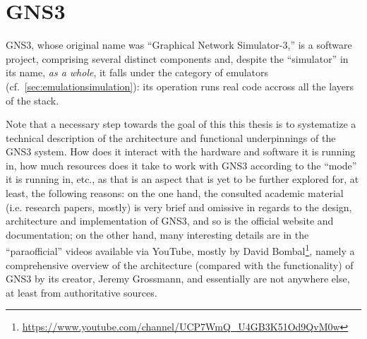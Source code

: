 
\chapter{GNS3}
\label{ch:gns3}

GNS3, whose original name was ``Graphical Network Simulator-3,'' is a software project, comprising several distinct components and, despite the ``simulator'' in its name, \emph{as a whole}, it falls under the category of emulators (cf.~\ref{sec:emulationsimulation}): its operation runs real code accross all the layers of the stack. %

Note that a necessary step towards the goal of this this thesis is to systematize a technical description of the architecture and functional underpinnings of the GNS3 system.
How does it interact with the hardware and software it is running in, how much resources does it take to work with GNS3 according to the ``mode'' it is running in, etc., as that is an aspect that is yet to be further explored for, at least, the following reasons:  %
on the one hand, the consulted academic material (i.e. research papers, mostly) is very brief and omissive in regards to the design, architecture and implementation of GNS3, and so is the official website and documentation; on the other hand, many interesting details are in the ``paraofficial'' videos available via YouTube, mostly by David Bombal\footnote{\url{https://www.youtube.com/channel/UCP7WmQ_U4GB3K51Od9QvM0w}}, namely a comprehensive overview of the architecture (compared with the functionality) of GNS3 by its creator, Jeremy Grossmann, and essentially are not anywhere else, at least from authoritative sources. %

